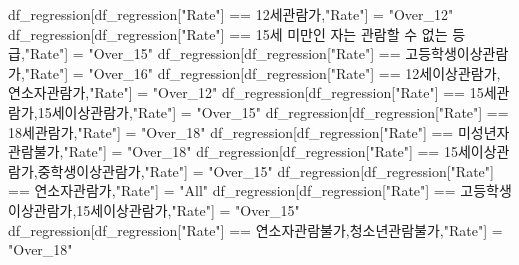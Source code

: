 \documentclass[
]{article}
\newenvironment{Shaded}{\begin{snugshade}}{\end{snugshade}}
\newcommand{\NormalTok}[1]{#1}
\newcommand{\OtherTok}[1]{\textcolor[rgb]{0.56,0.35,0.01}{#1}}
\newcommand{\SpecialCharTok}[1]{\textcolor[rgb]{0.00,0.00,0.00}{#1}}
\newcommand{\StringTok}[1]{\textcolor[rgb]{0.31,0.60,0.02}{#1}}
\begin{document}
\begin{Shaded}
\begin{Highlighting}[]
\NormalTok{df\_regression[df\_regression[}\StringTok{"Rate"}\NormalTok{] }\SpecialCharTok{==} \StringTok{\textquotesingle{}12세관람가\textquotesingle{}}\NormalTok{,}\StringTok{"Rate"}\NormalTok{] }\OtherTok{=} \StringTok{"Over\_12"}
\NormalTok{df\_regression[df\_regression[}\StringTok{"Rate"}\NormalTok{] }\SpecialCharTok{==} \StringTok{\textquotesingle{}15세 미만인 자는 관람할 수 없는 등급\textquotesingle{}}\NormalTok{,}\StringTok{"Rate"}\NormalTok{] }\OtherTok{=} \StringTok{"Over\_15"}
\NormalTok{df\_regression[df\_regression[}\StringTok{"Rate"}\NormalTok{] }\SpecialCharTok{==} \StringTok{\textquotesingle{}고등학생이상관람가\textquotesingle{}}\NormalTok{,}\StringTok{"Rate"}\NormalTok{] }\OtherTok{=} \StringTok{"Over\_16"}
\NormalTok{df\_regression[df\_regression[}\StringTok{"Rate"}\NormalTok{] }\SpecialCharTok{==} \StringTok{\textquotesingle{}12세이상관람가,연소자관람가\textquotesingle{}}\NormalTok{,}\StringTok{"Rate"}\NormalTok{] }\OtherTok{=} \StringTok{"Over\_12"}
\NormalTok{df\_regression[df\_regression[}\StringTok{"Rate"}\NormalTok{] }\SpecialCharTok{==} \StringTok{\textquotesingle{}15세관람가,15세이상관람가\textquotesingle{}}\NormalTok{,}\StringTok{"Rate"}\NormalTok{] }\OtherTok{=} \StringTok{"Over\_15"}
\NormalTok{df\_regression[df\_regression[}\StringTok{"Rate"}\NormalTok{] }\SpecialCharTok{==} \StringTok{\textquotesingle{}18세관람가\textquotesingle{}}\NormalTok{,}\StringTok{"Rate"}\NormalTok{] }\OtherTok{=} \StringTok{"Over\_18"}
\NormalTok{df\_regression[df\_regression[}\StringTok{"Rate"}\NormalTok{] }\SpecialCharTok{==} \StringTok{\textquotesingle{}미성년자관람불가\textquotesingle{}}\NormalTok{,}\StringTok{"Rate"}\NormalTok{] }\OtherTok{=} \StringTok{"Over\_18"}
\NormalTok{df\_regression[df\_regression[}\StringTok{"Rate"}\NormalTok{] }\SpecialCharTok{==} \StringTok{\textquotesingle{}15세이상관람가,중학생이상관람가\textquotesingle{}}\NormalTok{,}\StringTok{"Rate"}\NormalTok{] }\OtherTok{=} \StringTok{"Over\_15"}
\NormalTok{df\_regression[df\_regression[}\StringTok{"Rate"}\NormalTok{] }\SpecialCharTok{==} \StringTok{\textquotesingle{}연소자관람가\textquotesingle{}}\NormalTok{,}\StringTok{"Rate"}\NormalTok{] }\OtherTok{=} \StringTok{"All"}
\NormalTok{df\_regression[df\_regression[}\StringTok{"Rate"}\NormalTok{] }\SpecialCharTok{==} \StringTok{\textquotesingle{}고등학생이상관람가,15세이상관람가\textquotesingle{}}\NormalTok{,}\StringTok{"Rate"}\NormalTok{] }\OtherTok{=} \StringTok{"Over\_15"}
\NormalTok{df\_regression[df\_regression[}\StringTok{"Rate"}\NormalTok{] }\SpecialCharTok{==} \StringTok{\textquotesingle{}연소자관람불가,청소년관람불가\textquotesingle{}}\NormalTok{,}\StringTok{"Rate"}\NormalTok{] }\OtherTok{=} \StringTok{"Over\_18"}

\end{Highlighting}
\end{Shaded}
\end{document}
